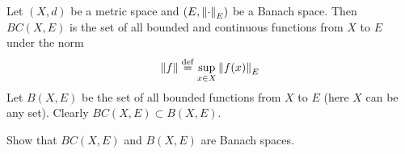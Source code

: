 \begin{defn}
	Let $(X,d)$ be a metric space and $(E,\left\lVert \cdot \right\rVert_E)$ be a Banach space.
	Then $BC(X,E)$ is the set of all bounded and continuous functions from $X$ to $E$ under the norm 
	\[\left\lVert f \right\rVert \overset{\mathrm{def}}{=} \sup_{x \in X} \left\lVert f(x) \right\rVert_E\]
	Let $B(X,E)$ be the set of all bounded functions from $X$ to $E$ (here $X$ can be any set).
	Clearly $BC(X,E) \subset B(X,E)$.
\end{defn}

\begin{exer}
	Show that $BC(X,E)$ and $B(X,E)$ are Banach spaces.
\end{exer}